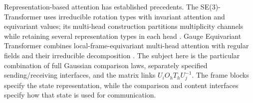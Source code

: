 \documentclass[twoside,11pt]{article}
\begin{document}
Representation-based attention has established precedents. The SE(3)-Transformer uses irreducible rotation types with invariant attention and equivariant values; its multi-head construction partitions multiplicity channels while retaining several representation types in each head \citep[Secs.~2.3 and 3.2, App.~D.3]{fuchs2020se3}. Gauge Equivariant Transformer combines local-frame-equivariant multi-head attention with regular fields and their irreducible decomposition \citep[Secs.~4.1--4.2]{He2021GaugeEquivariantTransformer}. The subject here is the particular combination of full Gaussian comparison laws, separately specified sending/receiving interfaces, and the matrix links $U_iO_hT_hU_j^{-1}$. The frame blocks specify the state representation, while the comparison and content interfaces specify how that state is used for communication.
\end{document}
